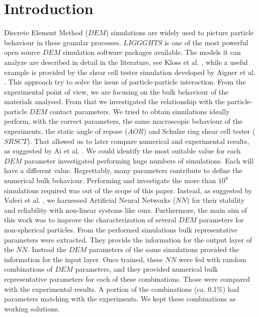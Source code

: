 \section{Introduction}
\label{sec:introduction}


Discrete Element Method ($DEM$) simulations are widely used to picture particle
behaviour in these granular processes.
$LIGGGHTS$ is one of the most powerful open source $DEM$ simulation software packages available. 
The models it can analyze are described in detail in the literature, see Kloss
et al. \cite{RefWorks:136}, while a useful example is provided by the shear cell tester 
simulation developed by Aigner et al. \cite{RefWorks:139}.
This approach try to solve the issue of particle-particle interaction. 
From the experimental point of view, we are focusing
on the bulk behaviour of the materials analysed.
From that we investigated the relationship with the particle-particle $DEM$
contact parameters.
We tried to obtain simulations ideally perform, with the correct parameters, 
the same macroscopic behaviour of the experiments, the static angle of repose
($AOR$) and Schulze ring shear cell tester ($SRSCT$). That allowed us to later
compare numerical and experimental results, as suggested by Ai et al.
\cite{RefWorks:131}.
We could identify the most suitable value for each $DEM$ parameter 
investigated performing huge numbers of simulations. Each will have a different
value. Regrettably, many parameters contribute to define the numerical bulk behaviour. Performing and investigate the 
more than $10^8$ simulations required was out of the scope of this paper.
Instead, as suggested by Vaferi et al. \cite{RefWorks:150}, we harnessed Artificial Neural Networks ($NN$) for their
stability and reliability with non-linear systems like ours.
Furthermore, the main aim of this work was to improve the characterization 
of several $DEM$ parameters for non-spherical particles. 
From the performed simulations bulk representative parameters were extracted. 
They provide the information for the output layer of the $NN$. Instead the $DEM$ 
parameters of the same simulations provided the information for the input layer. 
Once trained, these $NN$ were fed with random combinations of $DEM$ parameters,
and they provided numerical bulk representative parameters for each
of these combinations.
Those were compared with the experimental results. A portion of the combinations
(ca. 0.1\%) had parameters matching with the experiments.
We kept these combinations as working solutions.